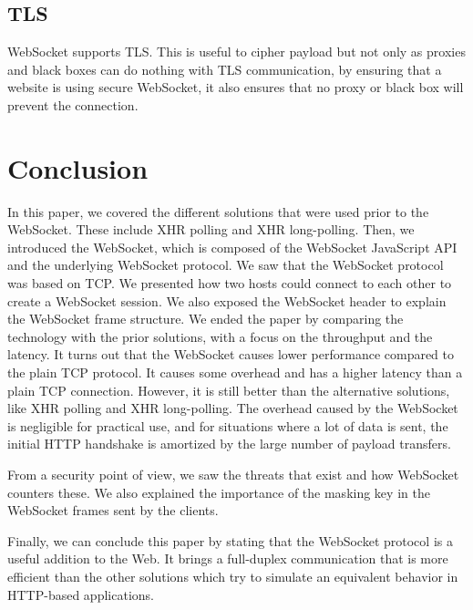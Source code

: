 \documentclass[10pt,journal,compsoc]{IEEEtran}
\newcommand{\ws}{WebSocket}
\begin{document}
\subsection{TLS}
\ws{} supports TLS.
This is useful to cipher payload but not only as proxies and black boxes can do nothing with TLS communication, by ensuring that a website is using secure \ws{}, it also ensures that no proxy or black box will prevent the connection.


\section{Conclusion}
In this paper, we covered the different solutions that were used prior to the \ws{}.
These include XHR polling and XHR long-polling.
Then, we introduced the \ws{}, which is composed of the \ws{} JavaScript API and the underlying \ws{} protocol. %
We saw that the \ws{} protocol was based on TCP.
We presented how two hosts could connect to each other to create a \ws{} session.
We also exposed the \ws{} header to explain the \ws{} frame structure. %
We ended the paper by comparing the technology with the prior solutions, with a focus on the throughput and the latency.
It turns out that the \ws{} causes lower performance compared to the plain TCP protocol.
It causes some overhead and has a higher latency than a plain TCP connection.
However, it is still better than the alternative solutions, like XHR polling and XHR long-polling. %
The overhead caused by the \ws{} is negligible for practical use, and for situations where a lot of data is sent, the initial HTTP handshake is amortized by the large number of payload transfers. %

From a security point of view, we saw the threats that exist and how \ws{} counters these.
We also explained the importance of the masking key in the \ws{} frames sent by the clients. %

Finally, we can conclude this paper by stating that the \ws{} protocol is a useful addition to the Web.
It brings a full-duplex communication that is more efficient than the other solutions which try to simulate an equivalent behavior in HTTP-based applications.

\ifCLASSOPTIONcaptionsoff
  \newpage
\fi




\end{document}
